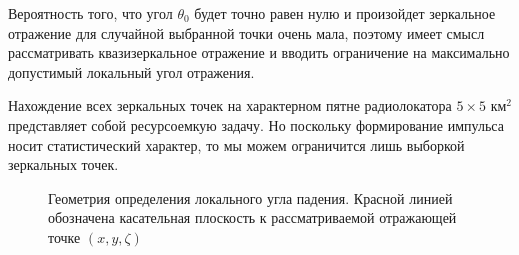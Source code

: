 Вероятность того, что угол $\theta_0$ будет точно равен нулю и произойдет
зеркальное отражение для случайной выбранной точки очень мала, поэтому имеет
смысл рассматривать квазизеркальное отражение и вводить ограничение на
максимально допустимый локальный угол отражения. 

Нахождение всех зеркальных точек на характерном пятне радиолокатора  $5\times
5 \text{ км}^2$ представляет собой ресурсоемкую задачу. Но поскольку формирование
импульса носит статистический характер, то мы можем ограничится лишь выборкой зеркальных точек. 





\begin{figure}[h!]
    \centering
    \def\svgwidth{0.75\linewidth}
    
    \caption{Геометрия определения локального угла падения. Красной линией
    обозначена касательная плоскость к рассматриваемой отражающей точке
$(x,y,\zeta)$}
    \label{fig:local_theta}
\end{figure}



